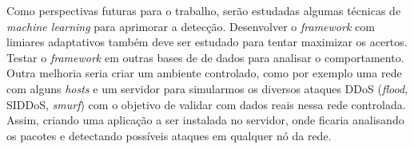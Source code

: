 Como perspectivas futuras para o trabalho, serão estudadas algumas técnicas de \textit{machine learning}  para aprimorar a detecção. Desenvolver o \textit{framework} com limiares adaptativos também deve ser estudado para tentar maximizar os acertos. Testar o \textit{framework} em outras bases de de dados para analisar o comportamento. Outra melhoria seria criar um ambiente controlado, como por exemplo uma rede com alguns \textit{hosts} e um servidor para simularmos os diversos ataques DDoS (\textit{flood}, SIDDoS, \textit{smurf}) com o objetivo de validar com dados reais nessa rede controlada. Assim, criando uma aplicação a ser instalada no servidor, onde ficaria analisando os pacotes e detectando possíveis ataques em qualquer nó da rede.



